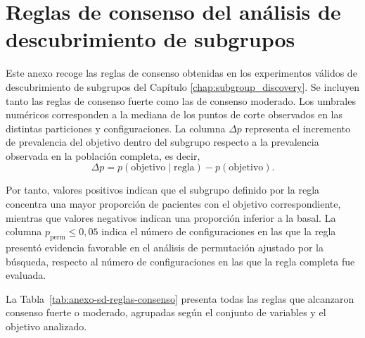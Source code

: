 \chapter{Reglas de consenso del análisis de descubrimiento de subgrupos}
\label{anexo:sd-reglas-consenso}

Este anexo recoge las reglas de consenso obtenidas en los experimentos válidos de descubrimiento de subgrupos del Capítulo \ref{chap:subgroup_discovery}. Se incluyen tanto las reglas de consenso fuerte como las de consenso moderado. Los umbrales numéricos corresponden a la mediana de los puntos de corte observados en las distintas particiones y configuraciones. La columna \(\Delta p\) representa el incremento de prevalencia del objetivo dentro del subgrupo respecto a la prevalencia observada en la población completa, es decir,
\[
\Delta p = p(\mathrm{objetivo}\mid \mathrm{regla}) - p(\mathrm{objetivo}).
\]

Por tanto, valores positivos indican que el subgrupo definido por la regla concentra una mayor proporción de pacientes con el objetivo correspondiente, mientras que valores negativos indican una proporción inferior a la basal.
La columna \(p_{\mathrm{perm}}\leq0{,}05\) indica el número de configuraciones en las que la regla presentó evidencia favorable en el análisis de permutación ajustado por la búsqueda, respecto al número de configuraciones en las que la regla completa fue evaluada.

La Tabla~\ref{tab:anexo-sd-reglas-consenso} presenta todas las reglas que alcanzaron consenso fuerte o moderado, agrupadas según el conjunto de variables y el objetivo analizado.

